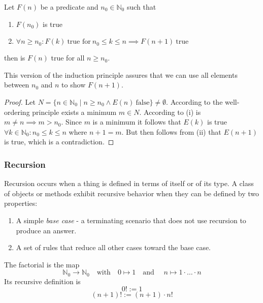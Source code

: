 \begin{proposition}
   Let \(F(n)\) be a predicate and \(n_0 \in \mathbb{N}_0\) such that
   \begin{enumerate}[label=\roman*, align=Center]
      \item \(F(n_0)\) is true
      \item \(\forall n \geq n_0: F(k)~\text{true for}~n_0 \leq k \leq n \implies F(n + 1)~\text{true}\)
   \end{enumerate}
   then is \(F(n)\) true for all \(n \geq n_0\).
\end{proposition}
\begin{remark}
   This version of the induction principle assures that we can use all elements between \(n_0\) and \(n\) to show \(F(n+1)\).
\end{remark}
\begin{proof}
   Let \(N = \{n \in \mathbb{N}_0 \mid n \geq n_0 \land E(n)~\text{false}\} \neq \emptyset\).
   According to the well-ordering principle exists a minimum \(m \in N\).
   According to (i) is \(m \neq n \implies m > n_0\).
   Since \(m\) is a minimum it follows that \(E(k)\) is true \(\forall k \in \mathbb{N}_0: n_0 \leq k \leq n\) where \(n + 1 = m\).
   But then follows from (ii) that \(E(n+1)\) is true, which is a contradiction.
\end{proof}

\subsubsection{Recursion}
Recursion occurs when a thing is defined in terms of itself or of its type.
A class of objects or methods exhibit recursive behavior when they can be defined by two properties:
\begin{enumerate}
   \item A simple \emph{base case} - a terminating scenario that does not use recursion to produce an answer.
   \item A set of rules that reduce all other cases toward the base case.
\end{enumerate}

\begin{example}
   The factorial is the map
   \[\mathbb{N}_0 \to \mathbb{N}_0 \quad\text{with}\quad 0 \mapsto 1 \quad\text{and }\quad n \mapsto 1 \cdot \ldots \cdot n\]
   Its recursive definition is
   \[0! := 1\]
   \[(n+1)! := (n + 1) \cdot n!\]
\end{example}

